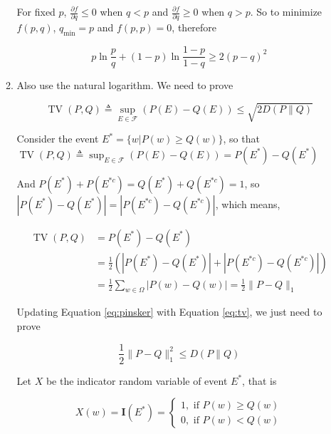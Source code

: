 \documentclass[a4paper]{article}
\begin{document}
\begin{enumerate}
\begin{enumerate}
  For fixed $p$, $\frac{\partial f}{\partial q} \leqslant 0$ when $q<p$ and $\frac{\partial f}{\partial q} \geqslant 0$ when $q>p$. So to minimize $f(p,q)$, $q_{\min}=p$ and $f(p,p)=0$, therefore  

  \begin{equation}
    p \ln \frac{p}{q} + (1-p)\ln \frac{1-p}{1-q}  \geqslant 2(p-q)^2
  \end{equation}

  \item Also use the natural logarithm. We need to prove 
  
  \begin{equation}\label{eq:pinsker}
    \operatorname{TV}(P, Q) \triangleq \sup _{E \in \mathcal{F}}(P(E)-Q(E))\leqslant \sqrt{{2} D(P \| Q)} 
  \end{equation}
  
  Consider the event $E^* = \{w| P(w)\geqslant Q(w)  \}$, so that $\operatorname{TV}(P, Q) \triangleq \sup _{E \in \mathcal{F}}(P(E)-Q(E)) = P(E^*) - Q(E^*)$

  And $P(E^*) + P(E^{*c}) = Q(E^*) + Q(E^{*c}) = 1$, so $|P(E^*) -Q(E^*)|= | P(E^{*c})- Q(E^{*c})|$,  which means,


  \begin{equation}\label{eq:tv}
    \begin{aligned}
      \operatorname{TV}(P, Q)&  = P(E^*) - Q(E^*) \\ 
      &= \frac 1 2 \left(|P(E^*) -Q(E^*)|+| P(E^{*c})- Q(E^{*c})|\right) \\
      & = \frac 1 2\sum_{w\in \Omega} |P(w)-Q(w)| = \frac 1 2 \|P-Q \|_1
    \end{aligned}
  \end{equation}

  Updating Equation \ref{eq:pinsker} with Equation \ref{eq:tv}, we just need to prove 

  \begin{equation}
    \frac 1 2 \|P-Q \|^2_1 \leqslant  D(P \| Q)
  \end{equation}
  
  Let $X$ be the indicator random variable of event $E^*$, that is

  \begin{equation}
    X(w) = \mathbf{I}(E^*) = \left\{ \begin{aligned}
      1, \text{ if } P(w) \geqslant Q(w) \\
      0, \text{ if } P(w) < Q(w)
    \end{aligned}
      \right.
  \end{equation}


\end{enumerate}
\end{enumerate}
\end{document}
